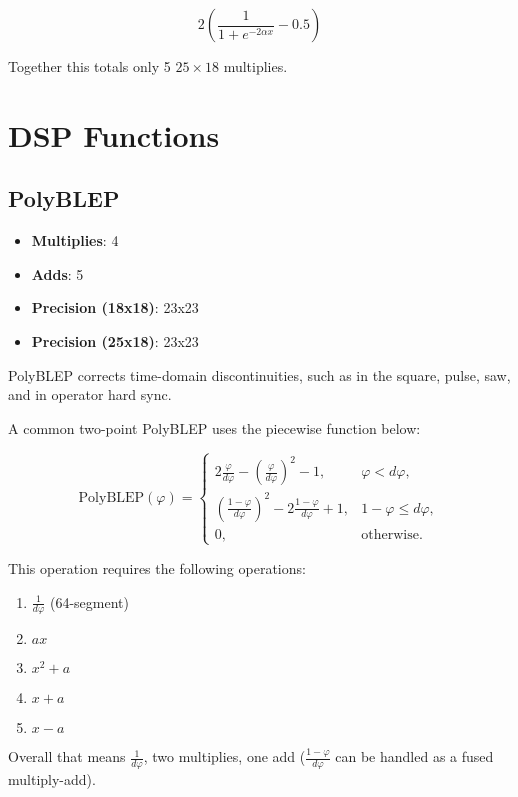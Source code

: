 \begin{equation*}
	2\left(\frac{1}{1+e^{-2\alpha x}}-0.5\right)
\end{equation*}

Together this totals only 5 $25\times18$ multiplies.

\chapter{DSP Functions}

\section{PolyBLEP}

\begin{itemize}
	\item \textbf{Multiplies}:  4
	\item \textbf{Adds}: 5
	\item \textbf{Precision (18x18)}:  23x23
	\item \textbf{Precision (25x18)}:  23x23
\end{itemize}

PolyBLEP corrects time-domain discontinuities, such as in the square, pulse, saw, and in operator hard sync.

A common two-point PolyBLEP uses the piecewise function below:

\begin{equation*}
	\text{PolyBLEP}\left(\varphi\right)=
	\begin{cases}
		2\frac{\varphi}{d\varphi}-\left(\frac{\varphi}{d\varphi}\right)^2-1, & \varphi < d\varphi, \\ 
		\left(\frac{1-\varphi}{d\varphi}\right)^2-2\frac{1-\varphi}{d\varphi}+1, & 1-\varphi \leq d\varphi, \\
		0, & \text{otherwise.}
	\end{cases}
\end{equation*}

This operation requires the following operations:

\begin{enumerate}
	\item $\frac{1}{d\varphi}$ (64-segment)
	\item $ax$
	\item $x^2+a$
	\item $x+a$
	\item $x-a$
\end{enumerate}

Overall that means $\frac{1}{d\varphi}$, two multiplies, one add ($\frac{1-\varphi}{d\varphi}$ can be handled as a fused multiply-add).

